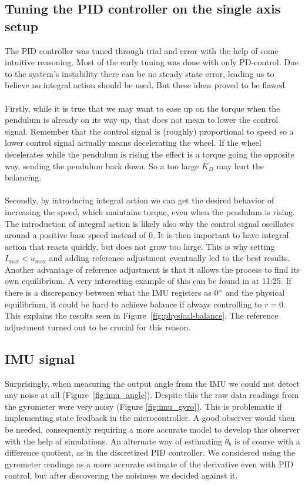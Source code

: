 \subsection{Tuning the PID controller on the single axis setup}
The PID controller was tuned through trial and error with the help of some intuitive reasoning. Most of the early tuning was done with only PD-control. Due to the system's instability there can be no steady state error, leading us to believe no integral action should be used. But these ideas proved to be flawed.
\\\\
Firstly, while it is true that we may want to ease up on the torque when the pendulum is already on its way up, that does not mean to lower the control signal. Remember that the control signal is (roughly) proportional to speed so a lower control signal actually means decelerating the wheel. If the wheel decelerates while the pendulum is rising the effect is a torque going the opposite way, sending the pendulum back down. So a too large $K_D$ may hurt the balancing.
\\\\
Secondly, by introducing integral action we can get the desired behavior of increasing the speed, which maintains torque, even when the pendulum is rising. The introduction of integral action is likely also why the control signal oscillates around a positive base speed instead of 0. It is then important to have integral action that reacts quickly, but does not grow too large. This is why setting $I_{\text{max}} < u_{\text{max}}$ and adding reference adjustment eventually led to the best results. Another advantage of reference adjustment is that it allows the process to find its own equilibrium. A very interesting example of this can be found in \cite{LEGO-video} at 11:25. If there is a discrepancy between what the IMU registers as $0\degree$ and the physical equilibrium, it could be hard to achieve balance if always controlling to $r=0$. This explains the results seen in Figure~\ref{fig:physical-balance}. The reference adjustment turned out to be crucial for this reason.

\subsection{IMU signal}
Surprisingly, when measuring the output angle from the IMU we could not detect any noise at all (Figure~\ref{fig:imu_angle}). Despite this the raw data readings from the gyrometer were very noisy (Figure \ref{fig:imu_gyro}). This is problematic if implementing state feedback in the microcontroller. A good observer would then be needed, consequently requiring a more accurate model to develop this observer with the help of simulations. An alternate way of estimating $\dot\theta_b$ is of course with a difference quotient, as in the discretized PID controller. We considered using the gyrometer readings as a more accurate estimate of the derivative even with PID control, but after discovering the noisiness we decided against it.

